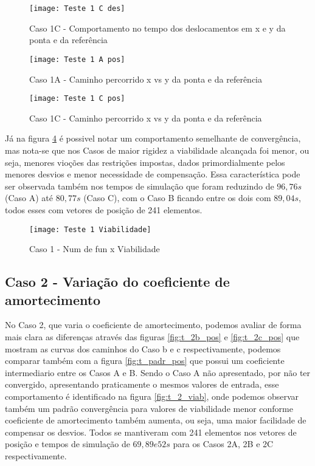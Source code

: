 \begin{figure}[H]
    \begin{center}
    \caption{Caso 1C - Comportamento no tempo dos deslocamentos em x e y da ponta e da referência}
    \texttt{[image: Teste 1 C des]}
    \label{fig:t_1c_des}
    \end{center}
\end{figure}

\begin{figure}[H]
    \begin{center}
    \caption{Caso 1A - Caminho percorrido x vs y da ponta e da referência}
    \texttt{[image: Teste 1 A pos]}
    \label{fig:t_1a_pos}
    \end{center}
\end{figure}

\begin{figure}[H]
    \begin{center}
    \caption{Caso 1C - Caminho percorrido x vs y da ponta e da referência}
    \texttt{[image: Teste 1 C pos]}
    \label{fig:t_1c_pos}
    \end{center}
\end{figure}

Já na figura \ref{fig:t_1_viab} é possivel notar um comportamento semelhante de convergência, mas nota-se que
nos Casos de maior rigidez a viabilidade alcançada foi menor, ou seja, menores vioções das restrições impostas, dados
primordialmente pelos menores desvios e menor necessidade de compensação.
Essa característica pode ser observada também nos tempos de simulação que foram reduzindo de $96,76 s$ (Caso A) até
$80,77 s$ (Caso C), com o Caso B ficando entre os dois com $89,04 s$, todos esses com vetores de posição de 241 elementos.

\begin{figure}[H]
    \begin{center}
    \caption{Caso 1 - Num de fun x Viabilidade}
    \texttt{[image: Teste 1 Viabilidade]}
    \label{fig:t_1_viab}
    \end{center}
\end{figure}

\subsection{Caso 2 - Variação do coeficiente de amortecimento}
No Caso 2, que varia o coeficiente de amortecimento, podemos avaliar de forma mais clara as diferenças através das figuras
\ref{fig:t_2b_pos} e \ref{fig:t_2c_pos} que mostram as curvas dos caminhos do Caso b e c respectivamente, podemos comparar também
com a figura \ref{fig:t_padr_pos} que possui um coeficiente intermediario entre os Casos A e B.
Sendo o Caso A não apresentado, por não ter convergido, apresentando praticamente o mesmos valores de entrada, esse comportamento
é identificado na figura \ref{fig:t_2_viab}, onde podemos observar também um padrão convergência para valores de viabilidade menor conforme
coeficiente de amortecimento também aumenta, ou seja, uma maior facilidade de compensar os desvios.
Todos se mantiveram com 241 elementos nos vetores de posição e tempos de simulação de $69, 89 e 52 s$ para os Casos 2A, 2B e 2C respectivamente.

